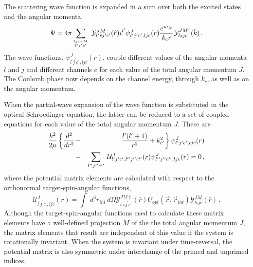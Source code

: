 The scattering wave function is expanded in a sum over both the excited
states and the angular momenta,
\begin{equation}
\Psi=4\pi\sum_{{{ljcJM\atop l^{\prime}j^{\prime}c^{\prime}}}}\;{\mathcal{%
Y}}_{l^{\prime}sj^{\prime}c^{\prime}}^{JM}(\hat{r})i^{l^{\prime}}\psi_{l^{%
\prime}j^{\prime}c^{\prime},ljc}^{J}(r)\frac{e^{i\sigma_{lc}}}{k_{c}r}{%
\mathcal{Y}}_{lsjc}^{JM\dagger}(\hat{k})\,.  \label{cpar}
\end{equation}
The wave functions, $\psi_{l^{\prime}j^{\prime}c^{\prime},ljc}^{J}(r)$,
couple different values of the angular momenta $l$ and $j$ and different
channels $c$ for each value of the total angular momentum $J$. The Coulomb
phase now depends on the channel energy, through $k_{c}$, as well as on the
angular momentum.

When the partial-wave expansion of the wave function is substituted in the
optical Schroedinger equation, the latter can be reduced to a set of coupled
equations for each value of the total angular momentum $J$. These are
\begin{eqnarray}
\frac{\hbar^{2}}{2\mu}\left\{ \frac{d^{2}}{dr^{2}}\right. & - & \left.\frac{%
l^{\prime}(l^{\prime}+1)}{r^{2}}+k_{c^{\prime}}^{2}\right\}
\psi_{l^{\prime}j^{\prime}c^{\prime},ljc}^{J}(r) \\
& - & \sum_{l^{\prime\prime}j^{\prime\prime}c^{\prime\prime}}\;{\mathcal{U}}%
_{l^{\prime}j^{\prime}c^{\prime},l^{\prime\prime}j^{\prime\prime}c^{\prime%
\prime}}^{J}(r)\psi_{l^{\prime\prime}j^{\prime\prime}c^{\prime%
\prime},ljc}^{J}(r)=0\,,  \notag
\end{eqnarray}
where the potential matrix elements are calculated with respect to the
orthonormal target-spin-angular functions,
\begin{equation}
{\mathcal{U}}_{l^{\prime}j^{\prime}c^{\prime},ljc}^{J}(r)=\int\;
d^{3}r_{int}\, d\Omega{\mathcal{Y}}_{l^{\prime}sj^{\prime}c^{\prime}}^{JM%
\dagger}(\hat{r})U_{opt}(\vec{r},\vec{r}_{int}){\mathcal{Y}}_{lsjc}^{JM}(%
\hat{r})\,.  \label{uljc}
\end{equation}
Although the target-spin-angular functions used to calculate these matrix
elements have a well-defined projection $M$ of the the total angular
momentum $J$, the matrix elements that result are independent of this value
if the system is rotationally invariant. When the system is invariant under
time-reversal, the potential matrix is also symmetric under interchange of
the primed and unprimed indices.

